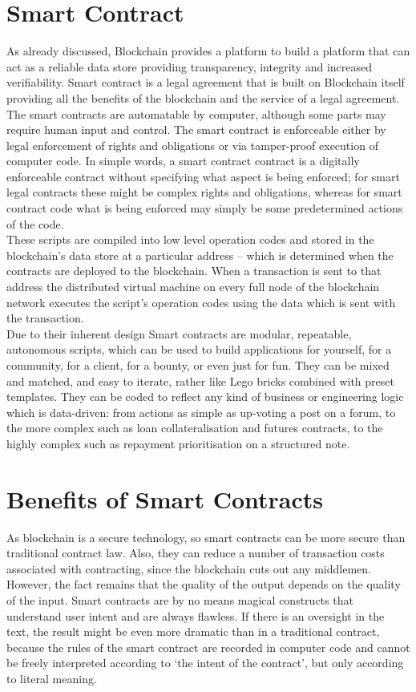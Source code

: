\section{Smart Contract}
As already discussed, Blockchain provides a platform to build a platform that can act as a reliable data store providing transparency, integrity and increased verifiability. Smart contract is a legal agreement that is built on Blockchain itself providing all the benefits of the blockchain and the service of a legal agreement. The smart contracts are automatable by computer, although some parts may require human input and control. The smart contract is enforceable either by legal enforcement of rights and obligations or via tamper-proof execution of computer code.\cite{Clack2016SmartDirections}
In simple words, a smart contract contract is a digitally enforceable contract without specifying what aspect is being enforced; for smart legal contracts these might be complex rights and obligations, whereas for smart contract code what is being enforced may simply be some predetermined actions of the code.
\\These scripts are compiled into low level operation codes and stored in the blockchain’s data store at a particular address – which is determined when the contracts are deployed to the blockchain. When a transaction is sent to that address the distributed virtual machine on every full node of the blockchain network executes the script’s operation codes using the data which is sent with the transaction. \cite{MonaxContracts}
\\Due to their inherent design Smart contracts are modular, repeatable, autonomous scripts, which can be used to build applications for yourself, for a community, for a client, for a bounty, or even just for fun. They can be mixed and matched, and easy to iterate, rather like Lego bricks combined with preset templates.
They can be coded to reflect any kind of business or engineering logic which is data-driven: from actions as simple as up-voting a post on a forum, to the more complex such as loan collateralisation and futures contracts, to the highly complex such as repayment prioritisation on a structured note.

\section{Benefits of Smart Contracts}
As blockchain is a secure technology, so smart contracts can be more secure than traditional contract law. Also, they can reduce a number of transaction costs associated with contracting, since the blockchain cuts out any middlemen. However, the fact remains that the quality of the output depends on the quality of the input. Smart contracts are by no means magical constructs that understand user intent and are always flawless. If there is an oversight in the text, the result might be even more dramatic than in a traditional contract, because the rules of the smart contract are recorded in computer code and cannot be freely interpreted according to ‘the intent of the contract’, but only according to literal meaning.

